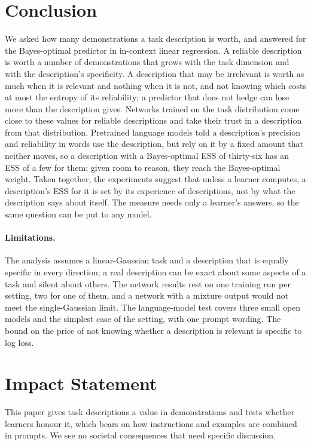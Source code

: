 \documentclass{article}
\begin{document}
\section{Conclusion}
We asked how many demonstrations a task description is worth, and answered for the Bayes-optimal predictor in in-context linear regression. A reliable description is worth a number of demonstrations that grows with the task dimension and with the description's specificity. A description that may be irrelevant is worth as much when it is relevant and nothing when it is not, and not knowing which costs at most the entropy of its reliability; a predictor that does not hedge can lose more than the description gives. Networks trained on the task distribution come close to these values for reliable descriptions and take their trust in a description from that distribution. Pretrained language models told a description's precision and reliability in words use the description, but rely on it by a fixed amount that neither moves, so a description with a Bayes-optimal ESS of thirty-six has an ESS of a few for them; given room to reason, they reach the Bayes-optimal weight. Taken together, the experiments suggest that unless a learner computes, a description's ESS for it is set by its experience of descriptions, not by what the description says about itself. The measure needs only a learner's answers, so the same question can be put to any model.

\paragraph{Limitations.} The analysis assumes a linear-Gaussian task and a description that is equally specific in every direction; a real description can be exact about some aspects of a task and silent about others. The network results rest on one training run per setting, two for one of them, and a network with a mixture output would not meet the single-Gaussian limit. The language-model test covers three small open models and the simplest case of the setting, with one prompt wording. The bound on the price of not knowing whether a description is relevant is specific to log loss.

\section*{Impact Statement}
This paper gives task descriptions a value in demonstrations and tests whether learners honour it, which bears on how instructions and examples are combined in prompts. We see no societal consequences that need specific discussion.
\end{document}

